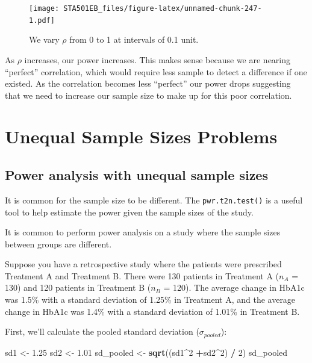 \documentclass[
]{book}
\newenvironment{Shaded}{\begin{snugshade}}{\end{snugshade}}
\newcommand{\DecValTok}[1]{\textcolor[rgb]{0.00,0.00,0.81}{#1}}
\newcommand{\FloatTok}[1]{\textcolor[rgb]{0.00,0.00,0.81}{#1}}
\newcommand{\FunctionTok}[1]{\textcolor[rgb]{0.13,0.29,0.53}{\textbf{#1}}}
\newcommand{\NormalTok}[1]{#1}
\newcommand{\OtherTok}[1]{\textcolor[rgb]{0.56,0.35,0.01}{#1}}
\newcommand{\SpecialCharTok}[1]{\textcolor[rgb]{0.81,0.36,0.00}{\textbf{#1}}}
\begin{document}
\begin{figure}
\centering
\texttt{[image: STA501EB\_files/figure-latex/unnamed-chunk-247-1.pdf]}
\caption{\label{fig:unnamed-chunk-247}We vary \(\rho\) from 0 to 1 at intervals of 0.1 unit.}
\end{figure}

As \(\rho\) increases, our power increases. This makes sense because we are nearing ``perfect'' correlation, which would require less sample to detect a difference if one existed. As the correlation becomes less ``perfect'' our power drops suggesting that we need to increase our sample size to make up for this poor correlation.

\hypertarget{unequal-sample-sizes-problems}{%
\section{Unequal Sample Sizes Problems}\label{unequal-sample-sizes-problems}}

\hypertarget{power-analysis-with-unequal-sample-sizes}{%
\subsection{\texorpdfstring{Power analysis with \textbf{unequal sample sizes}}{Power analysis with unequal sample sizes}}\label{power-analysis-with-unequal-sample-sizes}}

It is common for the sample size to be different. The \texttt{pwr.t2n.test()} is a useful tool to help estimate the power given the sample sizes of the study.

It is common to perform power analysis on a study where the sample sizes between groups are different.

Suppose you have a retrospective study where the patients were prescribed Treatment A and Treatment B. There were 130 patients in Treatment A (\(n_{A}\) = 130) and 120 patients in Treatment B (\(n_{B}\) = 120). The average change in HbA1c was 1.5\% with a standard deviation of 1.25\% in Treatment A, and the average change in HbA1c was 1.4\% with a standard deviation of 1.01\% in Treatment B.

First, we'll calculate the pooled standard deviation (\(\sigma_{pooled}\)):

\begin{Shaded}
\begin{Highlighting}[]
\NormalTok{sd1 }\OtherTok{\textless{}{-}} \FloatTok{1.25}
\NormalTok{sd2 }\OtherTok{\textless{}{-}} \FloatTok{1.01}
\NormalTok{sd\_pooled }\OtherTok{\textless{}{-}} \FunctionTok{sqrt}\NormalTok{((sd1}\SpecialCharTok{\^{}}\DecValTok{2} \SpecialCharTok{+}\NormalTok{sd2}\SpecialCharTok{\^{}}\DecValTok{2}\NormalTok{) }\SpecialCharTok{/} \DecValTok{2}\NormalTok{)}
\NormalTok{sd\_pooled}
\end{Highlighting}
\end{Shaded}
\end{document}
